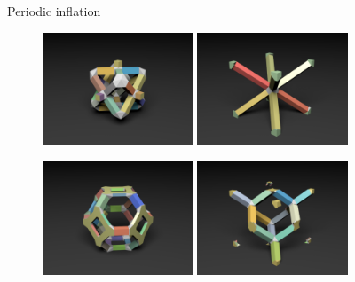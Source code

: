 \begin{frame}{Periodic inflation}
\begin{figure}
\hspace{\fill}
\includegraphics[width=0.4\textwidth]{Images/brick5_periodic.png}
\hspace{\fill}
\includegraphics[width=0.4\textwidth]{Images/star_periodic.png}
\hspace{\fill}

\vspace{3mm}
\hspace{\fill}
\includegraphics[width=0.4\textwidth]{Images/truncated_octahedron_periodic.png}
\hspace{\fill}
\includegraphics[width=0.4\textwidth]{Images/diamond_periodic.png}
\hspace{\fill}
\end{figure}
\end{frame}

